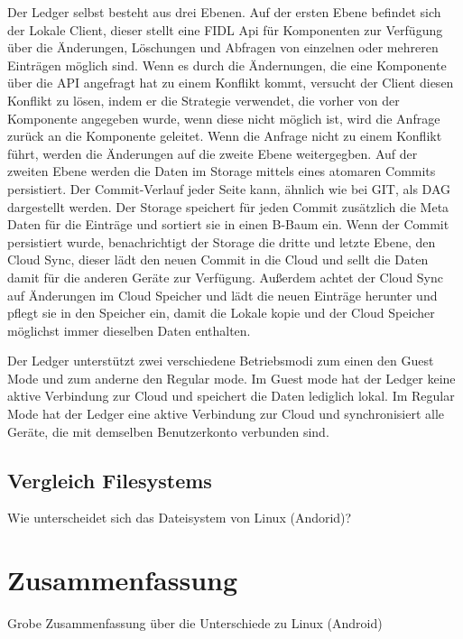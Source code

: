 \documentclass[a4paper]{scrartcl}
\begin{document}
Der Ledger selbst besteht aus drei Ebenen. Auf der ersten Ebene befindet sich der Lokale Client, dieser stellt eine FIDL Api für Komponenten zur Verfügung über die Änderungen, Löschungen und Abfragen von einzelnen oder mehreren Einträgen möglich sind. Wenn es durch die Ändernungen, die eine Komponente über die API angefragt hat zu einem Konflikt kommt, versucht der Client diesen Konflikt zu lösen, indem er die Strategie verwendet, die vorher von der Komponente angegeben wurde, wenn diese nicht möglich ist, wird die Anfrage zurück an die Komponente geleitet. Wenn die Anfrage nicht zu einem Konflikt führt, werden die Änderungen auf die zweite Ebene weitergegben. Auf der zweiten Ebene werden die Daten im Storage mittels eines atomaren Commits persistiert. Der Commit-Verlauf jeder Seite kann, ähnlich wie bei GIT, als DAG dargestellt werden. Der Storage speichert für jeden Commit zusätzlich die Meta Daten für die Einträge und sortiert sie in einen B-Baum ein. Wenn der Commit persistiert wurde, benachrichtigt der Storage die dritte und letzte Ebene, den Cloud Sync, dieser lädt den neuen Commit in die Cloud und sellt die Daten damit für die anderen Geräte zur Verfügung. Außerdem achtet der Cloud Sync auf Änderungen im Cloud Speicher und lädt die neuen Einträge herunter und pflegt sie in den Speicher ein, damit die Lokale kopie und der Cloud Speicher möglichst immer dieselben Daten enthalten. 

Der Ledger unterstützt zwei verschiedene Betriebsmodi zum einen den Guest Mode und zum anderne den Regular mode. Im Guest mode hat der Ledger keine aktive Verbindung zur Cloud und speichert die Daten lediglich lokal. Im Regular Mode hat der Ledger eine aktive Verbindung zur Cloud und synchronisiert alle Geräte, die mit demselben Benutzerkonto verbunden sind.
\subsection{Vergleich Filesystems}
Wie unterscheidet sich das Dateisystem von Linux (Andorid)?
\section{Zusammenfassung}
Grobe Zusammenfassung über die Unterschiede zu Linux (Android)




\end{document}
